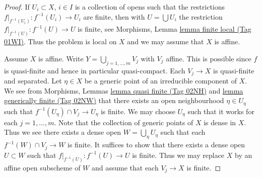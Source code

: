 \documentclass{amsart}
\theoremstyle{plain}
\theoremstyle{definition}
\theoremstyle{remark}
\numberwithin{equation}{subsection}
\begin{document}
\begin{proof}
If $U_i \subset X$, $i \in I$ is a collection of opens such that the
restrictions $f|_{f^{-1}(U_i)} : f^{-1}(U_i) \to U_i$ are finite,
then with $U = \bigcup U_i$ the restriction $f|_{f^{-1}(U)} : f^{-1}(U) \to U$
is finite, see
Morphisms, Lemma \href{https://stacks.math.columbia.edu/tag/01WI}{lemma finite local (Tag 01WI)}.
Thus the problem is local on $X$ and we may assume that $X$ is affine.

\medskip\noindent
Assume $X$ is affine.
Write $Y = \bigcup_{j = 1, \ldots, m} V_j$ with $V_j$ affine.
This is possible since $f$ is quasi-finite and hence
in particular quasi-compact. Each $V_j \to X$ is quasi-finite
and separated. Let $\eta \in X$ be a generic point of an irreducible
component of $X$. We see from
Morphisms, Lemmas
\href{https://stacks.math.columbia.edu/tag/02NH}{lemma quasi finite (Tag 02NH)} and \href{https://stacks.math.columbia.edu/tag/02NW}{lemma generically finite (Tag 02NW)}
that there exists an open neighbourhood $\eta \in U_\eta$ such that
$f^{-1}(U_\eta) \cap V_j \to U_\eta$ is finite. We may choose $U_\eta$ such
that it works for each $j = 1, \ldots, m$.
Note that the collection of generic points of $X$ is dense in $X$.
Thus we see there exists a dense open $W = \bigcup_\eta U_\eta$
such that each $f^{-1}(W) \cap V_j \to W$ is finite.
It suffices to show that there exists a dense open $U \subset W$
such that $f|_{f^{-1}(U)} : f^{-1}(U) \to U$ is finite.
Thus we may replace $X$ by an affine open subscheme of $W$ and
assume that each $V_j \to X$ is finite.


\end{proof}
\end{document}
